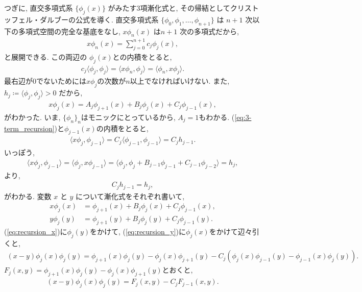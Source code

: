 \documentclass{ltjsarticle}
\theoremstyle{definition}
\begin{document}
つぎに, 直交多項式系 $\{\phi_j(x)\}$ がみたす3項漸化式と, その帰結としてクリストッフェル・ダルブーの公式を導く. 直交多項式系 $\{\phi_0, \phi_1, \dots, \phi_{n+1}\}$ は $n+1$ 次以下の多項式空間の完全な基底をなし, $x\phi_n(x)$ は$n+1$ 次の多項式だから,
\begin{align}
  x \phi_n(x) = \sum_{j=0}^{n+1} c_j \phi_j(x),
\end{align}
と展開できる. この両辺の $\phi_j(x)$との内積をとると,
\begin{align}
  c_j \langle \phi_j, \phi_j \rangle = \langle x \phi_n, \phi_j \rangle = \langle \phi_n, x \phi_j \rangle.
\end{align}
最右辺が0でないためには$x\phi_j$の次数が$n$以上でなければいけない. また, $h_j\coloneqq \langle \phi_j, \phi_j \rangle > 0$ だから,
\begin{align}
  x \phi_j(x) = A_j \phi_{j+1}(x) + B_j \phi_j(x) + C_j \phi_{j-1}(x),\label{eq:3-term_recursion}
\end{align}
がわかった. いま, $\{\phi_n\}_n$はモニックにとっているから, $A_j=1$もわかる. (\ref{eq:3-term_recursion})と$\phi_{j-1}(x)$の内積をとると,
\begin{align}
  \langle x\phi_j, \phi_{j-1} \rangle = C_j \langle \phi_{j-1}, \phi_{j-1} \rangle = C_j h_{j-1}.
\end{align}
いっぽう,
\begin{align}
  \langle x\phi_j, \phi_{j-1} \rangle = \langle \phi_j, x\phi_{j-1} \rangle = \langle \phi_j, \phi_j + B_{j-1}\phi_{j-1} + C_{j-1}\phi_{j-2} \rangle = h_j,
\end{align}
より,
\begin{align}
  C_j h_{j-1} = h_j,\label{eq:relation_C_norm}
\end{align}
がわかる. 変数 $x$ と $y$ について漸化式をそれぞれ書いて,
\begin{align}
  x \phi_j(x) & = \phi_{j+1}(x) + B_j \phi_j(x) + C_j \phi_{j-1}(x),\label{eq:recursion_x}\\
  y \phi_j(y) & = \phi_{j+1}(y) + B_j \phi_j(y) + C_j \phi_{j-1}(y).\label{eq:recursion_y}
\end{align}
(\ref{eq:recursion_x})に$\phi_j(y)$をかけて, (\ref{eq:recursion_y})に$\phi_j(x)$をかけて辺々引くと,
\begin{align}
  (x - y) \phi_j(x)\phi_j(y) = \phi_{j+1}(x)\phi_j(y) - \phi_j(x)\phi_{j+1}(y) - C_j \left( \phi_j(x)\phi_{j-1}(y) - \phi_{j-1}(x)\phi_j(y) \right).
\end{align}
$F_j(x, y) = \phi_{j+1}(x)\phi_j(y) - \phi_j(x)\phi_{j+1}(y)$とおくと,
\begin{align}
  (x - y) \phi_j(x)\phi_j(y) = F_j(x, y) - C_j F_{j-1}(x, y).
\end{align}
\end{document}
